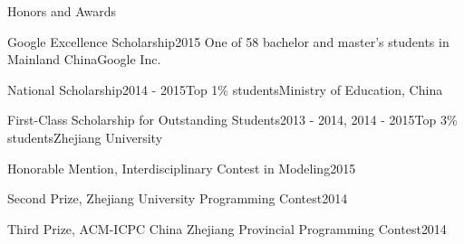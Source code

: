 \documentclass{resume} %
\begin{document}
\begin{rSection}{Honors and Awards}

\begin{rAwards}{Google Excellence Scholarship}{2015}
	{One of 58 bachelor and master's students in Mainland China}{Google Inc.}
\end{rAwards}

\begin{rAwards}{National Scholarship}{2014 - 2015}{Top 1\% students}{Ministry of Education, China}
\end{rAwards}

\begin{rAwards}{First-Class Scholarship for Outstanding Students}{2013 - 2014, 2014 - 2015}{Top 3\% students}{Zhejiang University}
\end{rAwards}

\begin{rAwards}{Honorable Mention, Interdisciplinary Contest in Modeling}{2015}{}{}
\end{rAwards}

\begin{rAwards}{Second Prize, Zhejiang University Programming Contest}{2014}{}{}
\end{rAwards}

\begin{rAwards}{Third Prize, ACM-ICPC China Zhejiang Provincial Programming Contest}{2014}{}{}
\end{rAwards}

\end{rSection}
\end{document}
